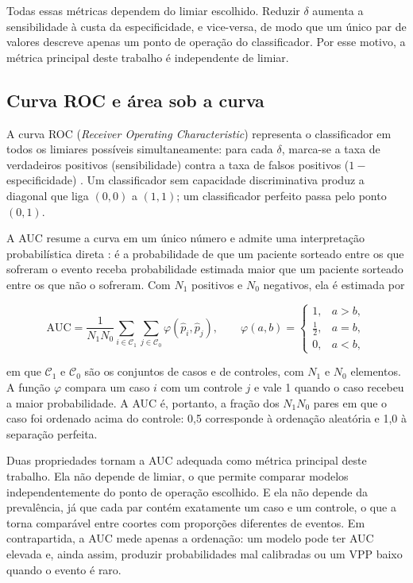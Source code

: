 Todas essas métricas dependem do limiar escolhido. Reduzir $\delta$ aumenta a
sensibilidade à custa da especificidade, e vice-versa, de modo que um único
par de valores descreve apenas um ponto de operação do classificador. Por
esse motivo, a métrica principal deste trabalho é independente de limiar.

\subsection{Curva ROC e área sob a curva}
\label{subsec:fund-roc}

A curva ROC (\textit{Receiver Operating Characteristic}) representa o
classificador em todos os limiares possíveis simultaneamente: para cada
$\delta$, marca-se a taxa de verdadeiros positivos (sensibilidade) contra a
taxa de falsos positivos ($1 -$ especificidade) \cite{fawcett2006introduction}.
Um classificador sem capacidade discriminativa produz a diagonal que liga
$(0, 0)$ a $(1, 1)$; um classificador perfeito passa pelo ponto $(0, 1)$.

A \gls{AUC} resume a curva em um único número e admite uma interpretação
probabilística direta \cite{hanley1982meaning}: é a probabilidade de que um
paciente sorteado entre os que sofreram o evento receba probabilidade
estimada maior que um paciente sorteado entre os que não o sofreram. Com
$N_1$ positivos e $N_0$ negativos, ela é estimada por

\begin{equation}
	\mathrm{AUC} = \frac{1}{N_1 N_0}
	\sum_{i \in \mathcal{C}_1} \sum_{j \in \mathcal{C}_0}
	\varphi\!\left(\hat{p}_i, \hat{p}_j\right),
	\qquad
	\varphi(a, b) =
	\begin{cases}
		1,            & a > b, \\
		\tfrac{1}{2}, & a = b, \\
		0,            & a < b,
	\end{cases}
	\label{eq:auc}
\end{equation}

\noindent
em que $\mathcal{C}_1$ e $\mathcal{C}_0$ são os conjuntos de casos e de
controles, com $N_1$ e $N_0$ elementos. A função $\varphi$ compara um caso
$i$ com um controle $j$ e vale 1 quando o caso recebeu a maior
probabilidade. A \gls{AUC} é, portanto, a fração dos $N_1 N_0$ pares em que
o caso foi ordenado acima do controle: 0,5 corresponde à ordenação aleatória
e 1,0 à separação perfeita.

Duas propriedades tornam a \gls{AUC} adequada como métrica principal deste
trabalho. Ela não depende de limiar, o que permite comparar modelos
independentemente do ponto de operação escolhido. E ela não depende da
prevalência, já que cada par contém exatamente um caso e um controle, o que
a torna comparável entre coortes com proporções diferentes de eventos. Em
contrapartida, a \gls{AUC} mede apenas a ordenação: um modelo pode ter
\gls{AUC} elevada e, ainda assim, produzir probabilidades mal calibradas ou
um \gls{VPP} baixo quando o evento é raro.


